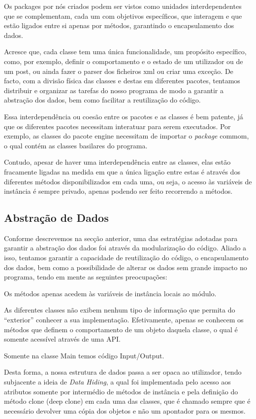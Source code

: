 \documentclass[a4paper]{article}
\begin{document}
Os packages por nós criados podem ser vistos como unidades interdependentes que se
complementam, cada um com objetivos específicos, que interagem e que estão ligados
entre si apenas por métodos, garantindo o encapsulamento dos dados.

Acresce que, cada classe tem uma única funcionalidade, um propósito específico,
como, por exemplo, definir o comportamento e o estado de um utilizador ou de um
post, ou ainda fazer o parser dos ficheiros xml ou criar uma exceção.
De facto, com a divisão física das classes e destas em diferentes pacotes, tentamos
distribuir e organizar as tarefas do nosso programa de modo a garantir a
abstração dos dados, bem como facilitar a reutilização do código.

Essa interdependência ou coesão entre os pacotes e as classes é bem patente, já que
os diferentes pacotes necessitam interatuar para serem executados. Por exemplo,
as classes do pacote engine necessitam de importar o \textit{package} commom, o
qual contém as classes basilares do programa.


Contudo, apesar de haver uma interdependência entre as classes, elas estão
fracamente ligadas na medida em que a única ligação entre estas é através dos
diferentes métodos disponibilizados em cada uma, ou seja, o acesso às variáveis de
instância é sempre privado, apenas podendo ser feito recorrendo a métodos.



\subsection{Abstração de Dados}
\label{sec:abstracao}

Conforme descrevemos na secção anterior, uma das estratégias adotadas para garantir
a abstração dos dados foi através da modularização do código.
Aliado a isso, tentamos garantir a capacidade de reutilização do código, o encapsulamento
dos dados, bem como a possibilidade de alterar os dados sem grande impacto no programa,
tendo em mente as seguintes preocupações:
\begin{itemize}
\begin{item} Os métodos apenas acedem às variáveis de instância locais ao módulo.\end{item}
\begin{item} As diferentes classes não exibem nenhum tipo de informação que permita
do ``exterior'' conhecer a sua implementação. Efetivamente, apenas se conhecem os
métodos que definem o comportamento de um objeto daquela classe, o qual é somente
acessível através de uma API.\end{item}
\begin{item} Somente na classe Main temos código Input/Output.\end{item}
\end{itemize}
Desta forma, a nossa estrutura de dados passa a ser opaca ao utilizador, tendo
subjacente a ideia de \textit{Data Hiding}, a qual foi implementada pelo acesso
aos atributos somente por intermédio de métodos de instância e pela definição do
método clone (deep clone) em cada uma das classes, que é chamado sempre que é
necessário devolver uma cópia dos objetos e não um apontador para os mesmos.
\end{document}
